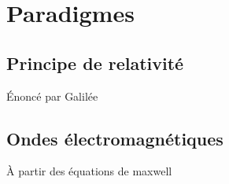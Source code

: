 
\section{Paradigmes}
%
%
\subsection{Principe de relativité}

Énoncé par Galilée

\begin{center}
\setlength{\fboxsep}{3mm}
\end{center}

\subsection{Ondes électromagnétiques}

À partir des équations de maxwell

\begin{center}
\setlength{\fboxsep}{3mm}
\end{center}
